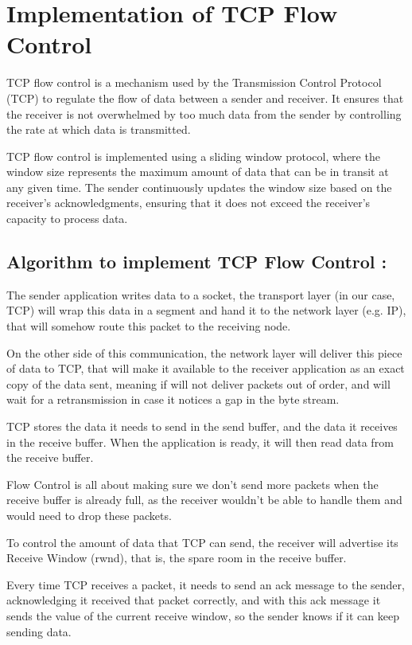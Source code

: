 \documentclass[11pt]{article}
\begin{document}
\section{Implementation of TCP Flow Control}

TCP flow control is a mechanism used by the Transmission Control Protocol (TCP) to regulate the flow of data between a sender and receiver. It ensures that the receiver is not overwhelmed by too much data from the sender by controlling the rate at which data is transmitted.

TCP flow control is implemented using a sliding window protocol, where the window size represents the maximum amount of data that can be in transit at any given time. The sender continuously updates the window size based on the receiver's acknowledgments, ensuring that it does not exceed the receiver's capacity to process data.

\subsection{Algorithm to implement TCP Flow Control : }

The sender application writes data to a socket, the transport layer (in our case, TCP) will wrap this data in a segment and hand it to the network layer (e.g. IP), that will somehow route this packet to the receiving node.

On the other side of this communication, the network layer will deliver this piece of data to TCP, that will make it available to the receiver application as an exact copy of the data sent, meaning if will not deliver packets out of order, and will wait for a retransmission in case it notices a gap in the byte stream.

TCP stores the data it needs to send in the send buffer, and the data it receives in the receive buffer. When the application is ready, it will then read data from the receive buffer.

Flow Control is all about making sure we don’t send more packets when the receive buffer is already full, as the receiver wouldn’t be able to handle them and would need to drop these packets.

To control the amount of data that TCP can send, the receiver will advertise its Receive Window (rwnd), that is, the spare room in the receive buffer.

Every time TCP receives a packet, it needs to send an ack message to the sender, acknowledging it received that packet correctly, and with this ack message it sends the value of the current receive window, so the sender knows if it can keep sending data.
\end{document}
